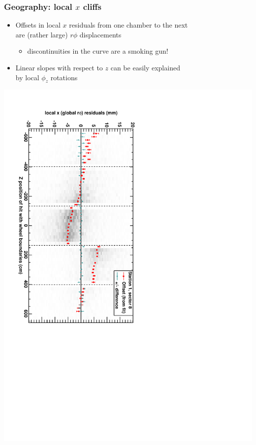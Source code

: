 \documentclass[compress]{beamer}
\begin{document}

\begin{frame}
\frametitle{Geography: local $x$ cliffs}
\begin{itemize}
\item Offsets in local $x$ residuals from one chamber to the next \\ are
  (rather large) $r\phi$ displacements
\begin{itemize}
\item discontinuities in the curve are a smoking gun!
\end{itemize}
\item Linear slopes with respect to $z$ can be easily explained \\ by local $\phi_z$ rotations
\end{itemize}

\begin{center}
\includegraphics[height=\linewidth, angle=90]{DTrphiVsZ_st1_sr08.pdf}
\end{center}
\end{frame}
\end{document}
